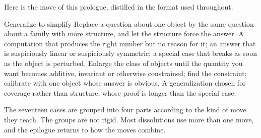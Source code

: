 \begin{refsection}
\noindent Here is the move of this prologue, distilled in the format used throughout.

\begin{move}{Generalize to simplify}
 Replace a question about one object by the same question about a family with more structure, and let the structure force the answer.
 A computation that produces the right number but no reason for it; an answer that is suspiciously linear or suspiciously symmetric; a special case that breaks as soon as the object is perturbed.
 Enlarge the class of objects until the quantity you want becomes additive, invariant or otherwise constrained; find the constraint; calibrate with one object whose answer is obvious.
 A generalization chosen for coverage rather than structure, whose proof is longer than the special case.
\end{move}



The seventeen cases are grouped into four parts according to the kind of move they teach. The groups are not rigid. Most dissolutions use more than one move, and the epilogue returns to how the moves combine.


\end{refsection}
